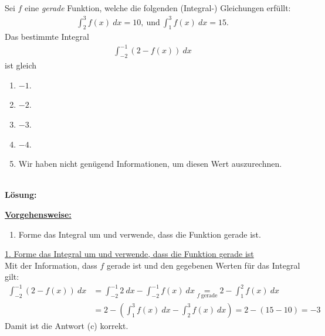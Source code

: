 \subsection*{}
Sei $ f $ eine \textit{gerade} Funktion, welche die folgenden (Integral-) Gleichungen erfüllt:
\begin{align*}
	\int_{2}^3 f(x) \ dx = 10, \ \textrm{und} \
	\int_1^3 f(x) \ dx = 15.
\end{align*}
Das bestimmte Integral
\begin{align*}
	\int_{-2}^{-1} (2 - f(x) ) \ dx
\end{align*}  
ist gleich
\renewcommand{\labelenumi}{(\alph{enumi})}
\begin{enumerate}
	\item 
	$ -1 $.
	\item
	$ -2 $.
	\item
	$ -3 $.
	\item
	$ -4 $.
	\item
	Wir haben nicht genügend Informationen, um diesen Wert auszurechnen.
\end{enumerate}
\ \\
\textbf{Lösung:}
\begin{mdframed}
\underline{\textbf{Vorgehensweise:}}
\renewcommand{\labelenumi}{\theenumi.}
\begin{enumerate}
\item Forme das Integral um und verwende, dass die Funktion gerade ist.
\end{enumerate}
\end{mdframed}

\underline{1. Forme das Integral um und verwende, dass die Funktion gerade ist}\\
Mit der Information, dass $f$ gerade ist und den gegebenen Werten für das Integral gilt:
\begin{align*}
	\int_{-2}^{-1} (2 - f(x) ) \ dx
	&=
	\int_{-2}^{-1} 2  \ dx
	-
	\int_{-2}^{-1} f(x) \ dx
	\underset{f \ \text{gerade}}{=}
	2
	-
	\int_{1}^{2} f(x) \ dx\\
	&=
	2 
	-
	\left(\int_{1}^{3} f(x) \ dx - \int_{2}^{3} f(x) \ dx\right)
	=
	2
	-
	(15 - 10)
	=-3
\end{align*}
Damit ist die Antwort (c) korrekt.

\newpage
